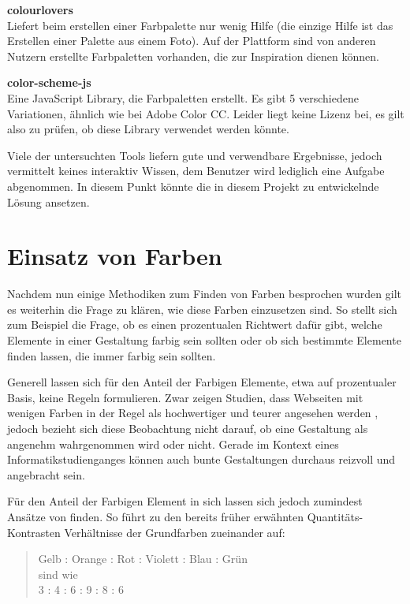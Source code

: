 \textbf{colourlovers} \\
Liefert beim erstellen einer Farbpalette nur wenig Hilfe (die einzige Hilfe ist das Erstellen einer Palette aus einem Foto). Auf der Plattform sind von anderen Nutzern erstellte Farbpaletten vorhanden, die zur Inspiration dienen können.

\textbf{color-scheme-js} \\
Eine JavaScript Library, die Farbpaletten erstellt. Es gibt 5 verschiedene Variationen, ähnlich wie bei Adobe Color CC. Leider liegt keine Lizenz bei, es gilt also zu prüfen, ob diese Library verwendet werden könnte.

Viele der untersuchten Tools liefern gute und verwendbare Ergebnisse, jedoch vermittelt keines interaktiv Wissen, dem Benutzer wird lediglich eine Aufgabe abgenommen. In diesem Punkt könnte die in diesem Projekt zu entwickelnde Lösung ansetzen.


\section{Einsatz von Farben}\label{einsatz}

Nachdem nun einige Methodiken zum Finden von Farben besprochen wurden gilt es weiterhin die Frage zu klären, wie diese Farben einzusetzen sind. So stellt sich zum Beispiel die Frage, ob es einen prozentualen Richtwert dafür gibt, welche Elemente in einer Gestaltung farbig sein sollten oder ob sich bestimmte Elemente finden lassen, die immer farbig sein sollten.

Generell lassen sich für den Anteil der Farbigen Elemente, etwa auf prozentualer Basis, keine Regeln formulieren. Zwar zeigen Studien, dass Webseiten mit wenigen Farben in der Regel als hochwertiger und teurer angesehen werden \cite{zhang2016makes}, jedoch bezieht sich diese Beobachtung nicht darauf, ob eine Gestaltung als angenehm wahrgenommen wird oder nicht. Gerade im Kontext eines Informatikstudienganges können auch bunte Gestaltungen durchaus reizvoll und angebracht sein.

Für den Anteil der Farbigen Element in sich lassen sich jedoch zumindest Ansätze von finden. So führt \cite[S. 59]{Itten201006} zu den bereits früher erwähnten Quantitäts-Kontrasten Verhältnisse der Grundfarben zueinander auf:

\begin{quote}
Gelb : Orange : Rot : Violett : Blau : Grün \\
sind wie \\
3 : 4 : 6 : 9 : 8 : 6
\end{quote}

